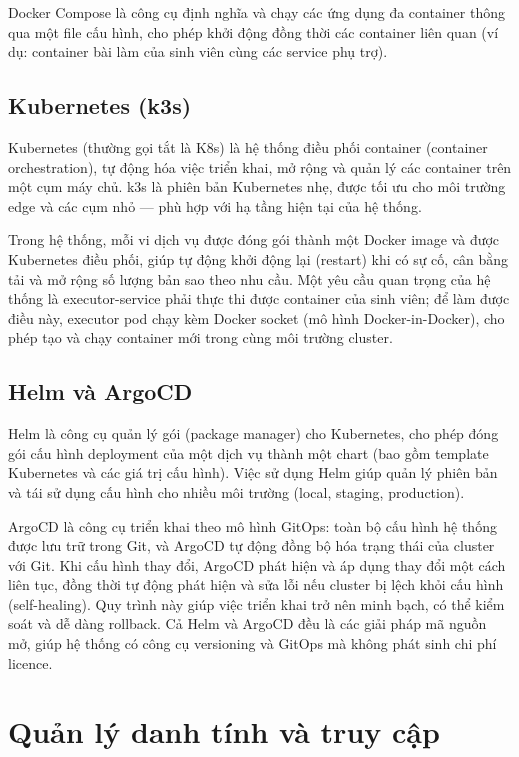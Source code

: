 \documentclass[../BTL.tex]{subfiles}
\begin{document}
Docker Compose là công cụ định nghĩa và chạy các ứng dụng đa container thông qua một file cấu hình, cho phép khởi động đồng thời các container liên quan (ví dụ: container bài làm của sinh viên cùng các service phụ trợ).

\subsection{Kubernetes (k3s)}
\label{section:2.7.2}

Kubernetes (thường gọi tắt là K8s) là hệ thống điều phối container (container orchestration), tự động hóa việc triển khai, mở rộng và quản lý các container trên một cụm máy chủ. k3s là phiên bản Kubernetes nhẹ, được tối ưu cho môi trường edge và các cụm nhỏ --- phù hợp với hạ tầng hiện tại của hệ thống.

Trong hệ thống, mỗi vi dịch vụ được đóng gói thành một Docker image và được Kubernetes điều phối, giúp tự động khởi động lại (restart) khi có sự cố, cân bằng tải và mở rộng số lượng bản sao theo nhu cầu. Một yêu cầu quan trọng của hệ thống là executor-service phải thực thi được container của sinh viên; để làm được điều này, executor pod chạy kèm Docker socket (mô hình Docker-in-Docker), cho phép tạo và chạy container mới trong cùng môi trường cluster.

\subsection{Helm và ArgoCD}
\label{section:2.7.3}

Helm là công cụ quản lý gói (package manager) cho Kubernetes, cho phép đóng gói cấu hình deployment của một dịch vụ thành một chart (bao gồm template Kubernetes và các giá trị cấu hình). Việc sử dụng Helm giúp quản lý phiên bản và tái sử dụng cấu hình cho nhiều môi trường (local, staging, production).

ArgoCD là công cụ triển khai theo mô hình GitOps: toàn bộ cấu hình hệ thống được lưu trữ trong Git, và ArgoCD tự động đồng bộ hóa trạng thái của cluster với Git. Khi cấu hình thay đổi, ArgoCD phát hiện và áp dụng thay đổi một cách liên tục, đồng thời tự động phát hiện và sửa lỗi nếu cluster bị lệch khỏi cấu hình (self-healing). Quy trình này giúp việc triển khai trở nên minh bạch, có thể kiểm soát và dễ dàng rollback. Cả Helm và ArgoCD đều là các giải pháp mã nguồn mở, giúp hệ thống có công cụ versioning và GitOps mà không phát sinh chi phí licence.

\section{Quản lý danh tính và truy cập}
\label{section:2.8}
\end{document}
